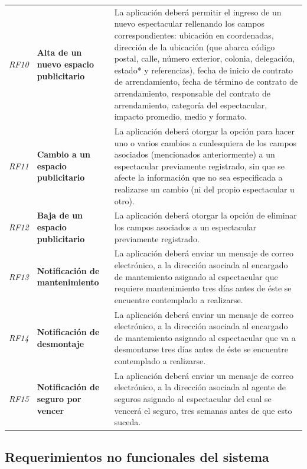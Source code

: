 \documentclass[12pt]{article}
\begin{document}
{\begin{longtable}[H]{m{2cm}m{4cm}m{6cm}}
    \textit{RF10} & \textbf{Alta de un nuevo espacio publicitario} & La aplicación deberá permitir el ingreso de un nuevo espectacular rellenando los campos correspondientes: ubicación en coordenadas, dirección de la ubicación (que abarca código postal, calle, número exterior, colonia, delegación, estado* y referencias), fecha de inicio de contrato de arrendamiento, fecha de término de contrato de arrendamiento, responsable del contrato de arrendamiento, categoría del espectacular, impacto promedio, medio y formato. \tabularnewline
    \textit{RF11} & \textbf{Cambio a un espacio publicitario} & La aplicación deberá otorgar la opción para hacer uno o varios cambios a cualesquiera de los campos asociados (mencionados anteriormente) a un espectacular previamente registrado, sin que se afecte la información que no sea especificada a realizarse un cambio (ni del propio espectacular u otro). \tabularnewline
    \textit{RF12} & \textbf{Baja de un espacio publicitario} & La aplicación deberá otorgar la opción de eliminar los campos asociados a un espectacular previamente registrado. \tabularnewline
    \textit{RF13} & \textbf{Notificación de mantenimiento} & La aplicación deberá enviar un mensaje de correo electrónico, a la dirección asociada al encargado de mantemiento asignado al espectacular que requiere mantenimiento tres días antes de éste se encuentre contemplado a realizarse. \tabularnewline
    \textit{RF14} & \textbf{Notificación de desmontaje} & La aplicación deberá enviar un mensaje de correo electrónico, a la dirección asociada al encargado de mantemiento asignado al espectacular que va a desmontarse tres días antes de éste se encuentre contemplado a realizarse. \tabularnewline
    \textit{RF15} & \textbf{Notificación de seguro por vencer} & La aplicación deberá enviar un mensaje de correo electrónico, a la dirección asociada al agente de seguros asignado al espectacular del cual se vencerá el seguro, tres semanas antes de que esto suceda. \tabularnewline
    \bottomrule
    
\end{longtable}
}
\newpage
\subsection{Requerimientos no funcionales del sistema}
\end{document}
